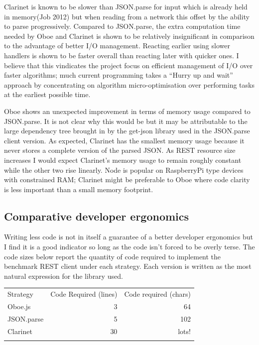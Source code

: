 \documentclass[12pt, ]{article}
\begin{document}
Clarinet is known to be slower than JSON.parse for input which is
already held in memory(Job 2012) but when reading from a network this
offset by the ability to parse progressively. Compared to JSON.parse,
the extra computation time needed by Oboe and Clarinet is shown to be
relatively insignificant in comparison to the advantage of better I/O
management. Reacting earlier using slower handlers is shown to be faster
overall than reacting later with quicker ones. I believe that this
vindicates the project focus on efficient management of I/O over faster
algorithms; much current programming takes a ``Hurry up and wait''
approach by concentrating on algorithm micro-optimisation over
performing tasks at the earliest possible time.

Oboe shows an unexpected improvement in terms of memory usage compared
to JSON.parse. It is not clear why this would be but it may be
attributable to the large dependency tree brought in by the get-json
library used in the JSON.parse client version. As expected, Clarinet has
the smallest memory usage because it never stores a complete version of
the parsed JSON. As REST resource size increases I would expect
Clarinet's memory usage to remain roughly constant while the other two
rise linearly. Node is popular on RaspberryPi type devices with
constrained RAM; Clarinet might be preferable to Oboe where code clarity
is less important than a small memory footprint.

\subsection{Comparative developer
ergonomics}\label{comparative-developer-ergonomics}

Writing less code is not in itself a guarantee of a better developer
ergonomics but I find it is a good indicator so long as the code isn't
forced to be overly terse. The code sizes below report the quantity of
code required to implement the benchmark REST client under each
strategy. Each version is written as the most natural expression for the
library used.

\begin{longtable}[c]{@{}lrr@{}}
\hline\noalign{\medskip}
Strategy & Code Required (lines) & Code required (chars)
\\\noalign{\medskip}
\hline\noalign{\medskip}
Oboe.js & 3 & 64
\\\noalign{\medskip}
JSON.parse & 5 & 102
\\\noalign{\medskip}
Clarinet & 30 & lots!
\\\noalign{\medskip}
\hline
\end{longtable}
\end{document}
